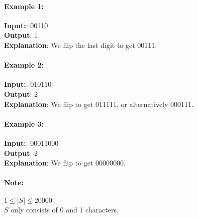 \paragraph{Example 1:}
\begin{flushleft}
\textbf{Input:}: 00110
\\
\textbf{Output}: 1
\\
\textbf{Explanation}: We flip the last digit to get 00111.
\end{flushleft}
\paragraph{Example 2:}
\begin{flushleft}
\textbf{Input:}: 010110
\\
\textbf{Output}: 2
\\
\textbf{Explanation}: We flip to get 011111, or alternatively 000111.
\end{flushleft}
\paragraph{Example 3:}
\begin{flushleft}
\textbf{Input:}: 00011000
\\
\textbf{Output}: 2
\\
\textbf{Explanation}: We flip to get 00000000.
\end{flushleft}
\paragraph{Note:}
\begin{flushleft}
$1 \leq |S| \leq 20000$
\\
$S$ only consists of 0 and 1 characters.
\end{flushleft}
